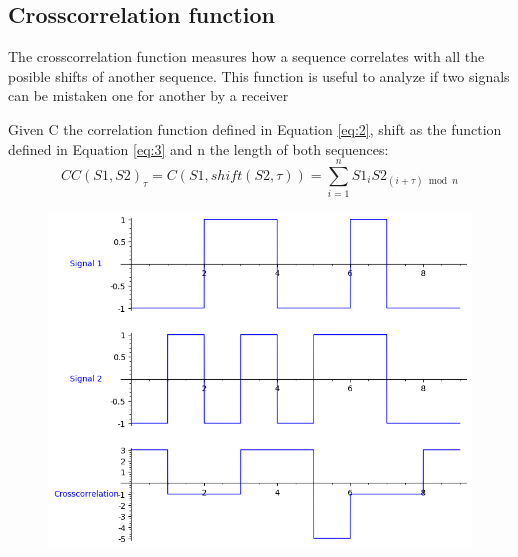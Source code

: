 \subsection{Crosscorrelation function}

The crosscorrelation function measures how a sequence correlates with all
the posible shifts of another sequence. This function is useful to analyze if two signals can be mistaken one for another by a
receiver 


\begin{definition}[Crosscorrelation]\label{def:4}
  Given C the correlation function defined in Equation \eqref{eq:2}, shift as the function defined in Equation \eqref{eq:3} and n the length of both sequences:
  \begin{equation}\label{eq:7}
    CC(S1, S2)_{\tau} = C(S1, shift(S2, \tau)) = \sum_{i=1}^{n}S1_{i}S2_{(i+\tau) \bmod n}
  \end{equation}
\end{definition}

\begin{figure}[ht!] %
\begin{center}
\includegraphics[width=0.7\linewidth]{Chapters/Introduction/signals_crosscorrelation}
\end{center}
\caption{}
\label{introduction_signals_crosscorrelation}
\end{figure}

